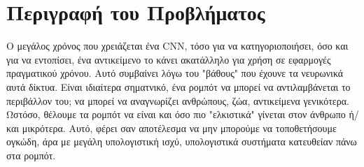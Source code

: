 \section{Περιγραφή του Προβλήματος}
\label{section:problem_description}

Ο μεγάλος χρόνος που χρειάζεται ένα CNN, τόσο για να κατηγοριοποιήσει, όσο και
για να εντοπίσει, ένα αντικείμενο το κάνει ακατάλληλο για χρήση σε εφαρμογές πραγματικού
χρόνου. Αυτό συμβαίνει λόγω του "βάθους" που έχουνε τα νευρωνικά αυτά δίκτυα.
Είναι ιδιαίτερα σηματνικό, ένα ρομπότ να μπορεί να αντιλαμβάνεται το περιβάλλον
του; να μπορεί να αναγνωρίζει ανθρώπους, ζώα, αντικείμενα γενικότερα. Ωστόσο,
θέλουμε τα ρομπότ να είναι και όσο πιο "ελκιστικά" γίνεται στον άνθρωπο ή/και μικρότερα.
Αυτό, φέρει σαν αποτέλεσμα να μην μπορούμε να τοποθετήσουμε ογκώδη, άρα με μεγάλη
υπολογιστική ισχύ, υπολογιστικά συστήματα κατευθείαν πάνω στα ρομπότ.

